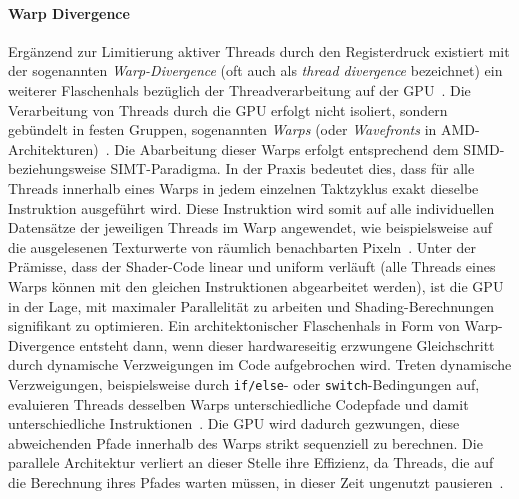 \paragraph{Warp Divergence}
Ergänzend zur Limitierung aktiver Threads durch den Registerdruck existiert mit der sogenannten \textit{Warp-Divergence}
(oft auch als \textit{thread divergence} bezeichnet) ein weiterer Flaschenhals bezüglich der Threadverarbeitung auf
der \ac{GPU}~\parencite[vgl.][S.~32]{akenine-mollerRealtimeRendering2019}.
Die Verarbeitung von Threads durch die \ac{GPU} erfolgt nicht isoliert, sondern gebündelt in festen Gruppen,
sogenannten \textit{Warps}
(oder \textit{Wavefronts} in AMD-Architekturen)~\parencite[vgl.][S.~31]{akenine-mollerRealtimeRendering2019}.
Die Abarbeitung dieser Warps erfolgt entsprechend dem \ac{SIMD}- beziehungsweise \ac{SIMT}-Paradigma.
In der Praxis bedeutet dies, dass für alle Threads innerhalb eines Warps in jedem einzelnen Taktzyklus exakt dieselbe
Instruktion ausgeführt wird.
Diese Instruktion wird somit auf alle individuellen Datensätze der jeweiligen Threads im Warp angewendet, wie
beispielsweise auf die ausgelesenen Texturwerte von räumlich benachbarten
Pixeln~\parencite[vgl.][Kap.~23.2]{akenine-mollerRealtimeRendering2019}.
Unter der Prämisse, dass der Shader-Code linear und uniform verläuft
(alle Threads eines Warps können mit den gleichen Instruktionen abgearbeitet werden), ist die \ac{GPU} in der Lage,
mit maximaler Parallelität zu arbeiten und Shading-Berechnungen signifikant zu optimieren.
Ein architektonischer Flaschenhals in Form von Warp-Divergence entsteht dann, wenn dieser hardwareseitig erzwungene
Gleichschritt durch dynamische Verzweigungen im Code aufgebrochen wird.
Treten dynamische Verzweigungen, beispielsweise durch \texttt{if/else}- oder \texttt{switch}-Bedingungen auf,
evaluieren Threads desselben Warps unterschiedliche Codepfade und damit unterschiedliche
Instruktionen~\parencite[vgl.][Kap.~3.1]{akenine-mollerRealtimeRendering2019}.
Die \ac{GPU} wird dadurch gezwungen, diese abweichenden Pfade innerhalb des Warps strikt sequenziell zu berechnen.
Die parallele Architektur verliert an dieser Stelle ihre Effizienz, da Threads, die auf die Berechnung
ihres Pfades warten müssen, in dieser Zeit ungenutzt
pausieren~\parencites(vgl.)()[Abschn.~\textit{The Logical Pipeline}, Punkt~6]{pixeljetstreamPixelJetStream2015}
[S.~32]{akenine-mollerRealtimeRendering2019}.
